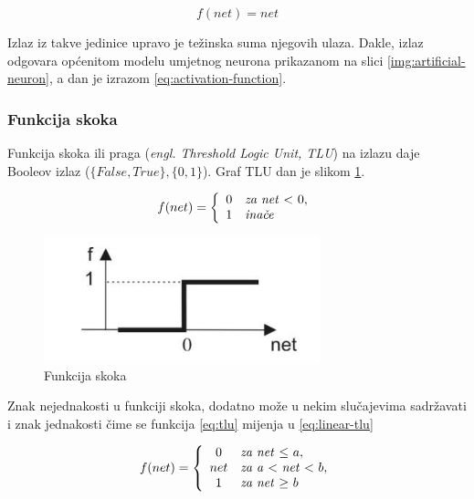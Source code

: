 \begin{equation}
f(net) = net
\label{eq:Adaline aktivacijska funkcija}
\end{equation}

Izlaz iz takve jedinice upravo je težinska suma njegovih ulaza. Dakle, izlaz odgovara općenitom modelu umjetnog neurona prikazanom na slici \ref{img:artificial-neuron}, a dan je izrazom \ref{eq:activation-function}.

\subsubsection{Funkcija skoka}

Funkcija skoka ili praga (\textit{engl. Threshold Logic Unit, TLU}) na izlazu daje Booleov izlaz ($\{False, True\}, \{0, 1\}$). Graf TLU dan je slikom \ref{img:tlu}.

\begin{equation}
f(net)=\left\{
\begin{array}{c l}	
     0 & $\textit{za net} $ < $ $ 0,\\
     1 & $\textit{inače}$
\end{array}\right.
\label{eq:Funkcija skoka}
\end{equation}

\begin{figure}[H]
\centering
\includegraphics[width=8cm]{img/TLU.png}
\caption{Funkcija skoka}
\label{img:tlu}
\end{figure}

Znak nejednakosti u funkciji skoka, dodatno može u nekim slučajevima sadržavati i znak jednakosti čime se funkcija \ref{eq:tlu} mijenja u \ref{eq:linear-tlu}

\begin{equation}
f(net)=\left\{
\begin{array}{c l}	
     0   & $\textit{za net} $ \leq $ $ a,\\
     net & $\textit{za a} $ < $ \textit{net} $ < $ $ b,\\
     1   & $\textit{za net} $ \geq $ $ b
\end{array}\right.
\label{eq:Funkcija skoka koja je na dijelovima linearna}
\end{equation}

